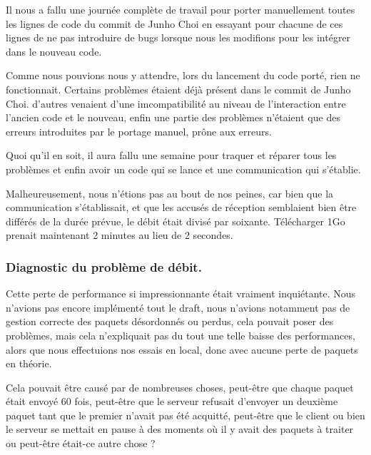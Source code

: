 Il nous a fallu une journée complète de travail pour porter manuellement toutes les lignes de code du commit de Junho Choi en essayant pour chacune de ces lignes de ne pas introduire de bugs lorsque nous les modifions pour les intégrer dans le nouveau code.

\vspace{0.5cm}

Comme nous pouvions nous y attendre, lors du lancement du code porté, rien ne fonctionnait. Certains problèmes étaient déjà présent dans le commit de Junho Choi. d'autres venaient d'une imcompatibilité au niveau de l'interaction entre l'ancien code et le nouveau, enfin une partie des problèmes n'étaient que des erreurs introduites par le portage manuel, prône aux erreurs.

\vspace{0.5cm}

Quoi qu'il en soit, il aura fallu une semaine pour traquer et réparer tous les problèmes et enfin avoir un code qui se lance et une communication qui s'établie.

\vspace{0.5cm}

Malheureusement, nous n'étions pas au bout de nos peines, car bien que la communication s'établissait, et que les accusés de réception semblaient bien être différés de la durée prévue, le débit était divisé par soixante. Télécharger 1Go prenait maintenant 2 minutes au lieu de 2 secondes.

\subsubsection{Diagnostic du problème de débit.}

Cette perte de performance si impressionnante était vraiment inquiétante. Nous n'avions pas encore implémenté tout le draft, nous n'avions notamment pas de gestion correcte des paquets désordonnés ou perdus, cela pouvait poser des problèmes, mais cela n'expliquait pas du tout une telle baisse des performances, alors que nous effectuions nos essais en local, donc avec aucune perte de paquets en théorie.

\vspace{0.5cm}

Cela pouvait être causé par de nombreuses choses, peut-être que chaque paquet était envoyé 60 fois, peut-être que le serveur refusait d'envoyer un deuxième paquet tant que le premier n'avait pas été acquitté, peut-être que le client ou bien le serveur se mettait en pause à des moments où il y avait des paquets à traiter ou peut-être était-ce autre chose ?

